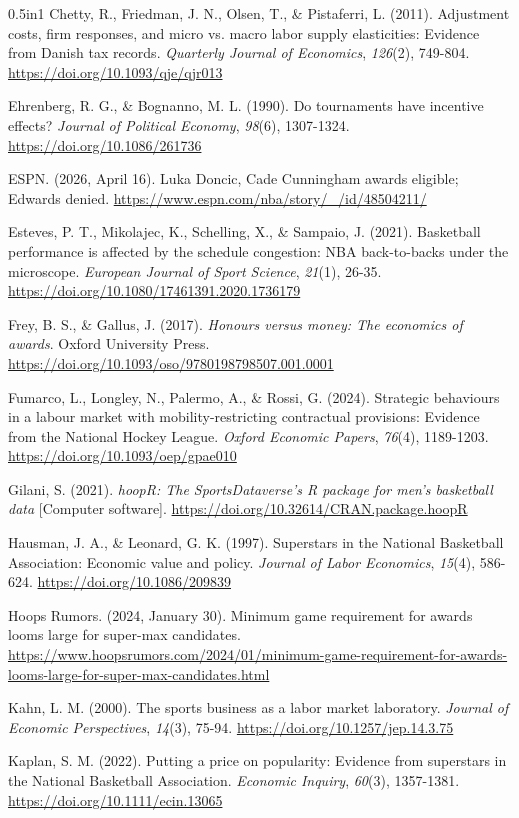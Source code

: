 \documentclass[12pt]{article}
\begin{document}
\begin{hangparas}{0.5in}{1}
Chetty, R., Friedman, J. N., Olsen, T., \& Pistaferri, L. (2011). Adjustment costs, firm responses, and micro vs. macro labor supply elasticities: Evidence from Danish tax records. \emph{Quarterly Journal of Economics}, \emph{126}(2), 749-804. \url{https://doi.org/10.1093/qje/qjr013}

Ehrenberg, R. G., \& Bognanno, M. L. (1990). Do tournaments have incentive effects? \emph{Journal of Political Economy}, \emph{98}(6), 1307-1324. \url{https://doi.org/10.1086/261736}

ESPN. (2026, April 16). Luka Doncic, Cade Cunningham awards eligible; Edwards denied. \url{https://www.espn.com/nba/story/_/id/48504211/}

Esteves, P. T., Mikolajec, K., Schelling, X., \& Sampaio, J. (2021). Basketball performance is affected by the schedule congestion: NBA back-to-backs under the microscope. \emph{European Journal of Sport Science}, \emph{21}(1), 26-35. \url{https://doi.org/10.1080/17461391.2020.1736179}

Frey, B. S., \& Gallus, J. (2017). \emph{Honours versus money: The economics of awards}. Oxford University Press. \url{https://doi.org/10.1093/oso/9780198798507.001.0001}

Fumarco, L., Longley, N., Palermo, A., \& Rossi, G. (2024). Strategic behaviours in a labour market with mobility-restricting contractual provisions: Evidence from the National Hockey League. \emph{Oxford Economic Papers}, \emph{76}(4), 1189-1203. \url{https://doi.org/10.1093/oep/gpae010}

Gilani, S. (2021). \emph{hoopR: The SportsDataverse's R package for men's basketball data} [Computer software]. \url{https://doi.org/10.32614/CRAN.package.hoopR}

Hausman, J. A., \& Leonard, G. K. (1997). Superstars in the National Basketball Association: Economic value and policy. \emph{Journal of Labor Economics}, \emph{15}(4), 586-624. \url{https://doi.org/10.1086/209839}

Hoops Rumors. (2024, January 30). Minimum game requirement for awards looms large for super-max candidates. \url{https://www.hoopsrumors.com/2024/01/minimum-game-requirement-for-awards-looms-large-for-super-max-candidates.html}

Kahn, L. M. (2000). The sports business as a labor market laboratory. \emph{Journal of Economic Perspectives}, \emph{14}(3), 75-94. \url{https://doi.org/10.1257/jep.14.3.75}

Kaplan, S. M. (2022). Putting a price on popularity: Evidence from superstars in the National Basketball Association. \emph{Economic Inquiry}, \emph{60}(3), 1357-1381. \url{https://doi.org/10.1111/ecin.13065}


\end{hangparas}
\end{document}
